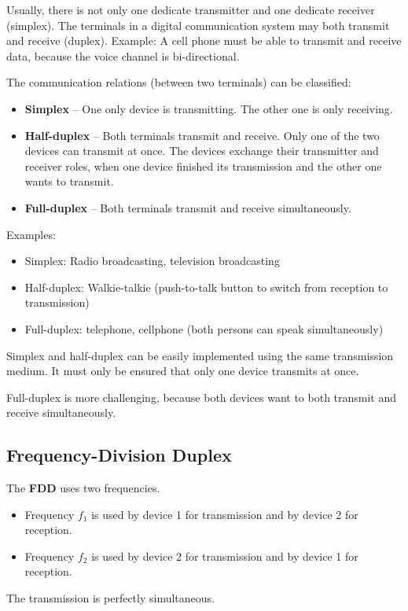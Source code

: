\begin{refsection}
Usually, there is not only one dedicate transmitter and one dedicate receiver (simplex). The terminals in a digital communication system may both transmit and receive (duplex). Example: A cell phone must be able to transmit and receive data, because the voice channel is bi-directional.

The communication relations (between two terminals) can be classified:
\begin{itemize}
	\item \textbf{Simplex} -- One only device is transmitting. The other one is only receiving.
	\item \textbf{Half-duplex} -- Both terminals transmit and receive. Only one of the two devices can transmit at once. The devices exchange their transmitter and receiver roles, when one device finished its transmission and the other one wants to transmit.
	\item \textbf{Full-duplex} -- Both terminals transmit and receive simultaneously.
\end{itemize}

Examples:
\begin{itemize}
	\item Simplex: Radio broadcasting, television broadcasting
	\item Half-duplex: Walkie-talkie (push-to-talk button to switch from reception to transmission)
	\item Full-duplex: telephone, cellphone (both persons can speak simultaneously)
\end{itemize}

Simplex and half-duplex can be easily implemented using the same transmission medium. It must only be ensured that only one device transmits at once.

Full-duplex is more challenging, because both devices want to both transmit and receive simultaneously.

\subsection{Frequency-Division Duplex}

The  \textbf{\acf{FDD}} uses two frequencies.
\begin{itemize}
	\item Frequency $f_1$ is used by device 1 for transmission and by device 2 for reception.
	\item Frequency $f_2$ is used by device 2 for transmission and by device 1 for reception.
\end{itemize}
The transmission is perfectly simultaneous.


\end{refsection}
